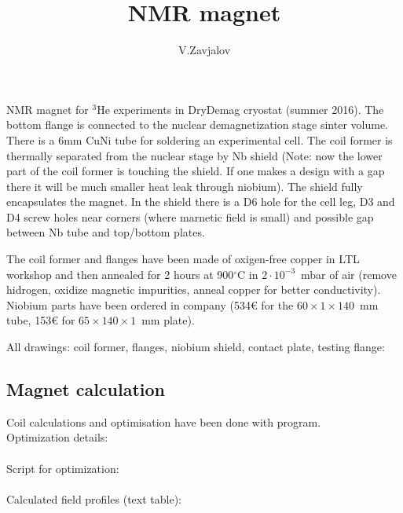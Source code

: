 \documentclass[a4paper]{article}
\title{NMR magnet}
\author{V.Zavjalov}
\begin{document}
\maketitle

NMR magnet for $^3$He experiments in DryDemag cryostat (summer 2016). The bottom flange
is connected to the nuclear demagnetization stage sinter volume. There is
a 6mm CuNi tube for soldering an experimental cell. The coil former is
thermally separated from the nuclear stage by Nb shield (Note: now the
lower part of the coil former is touching the shield. If one makes a
design with a gap there it will be much smaller heat leak through
niobium). The shield fully encapsulates the magnet. In the shield there
is a D6 hole for the cell leg, D3 and D4 screw holes near corners (where
marnetic field is small) and possible gap between Nb tube and top/bottom
plates.


The coil former and flanges have been made of oxigen-free copper in LTL
workshop and then annealed for 2 hours at 900$^\circ$C in
$2\cdot10^{-3}$~mbar of air (remove hidrogen, oxidize magnetic
impurities, anneal copper for better conductivity). Niobium parts have
been ordered in \Firmetal{} company (534\euro{} for the
$60\times1\times140$~mm tube, 153\euro{} for $65\times140\times1$~mm
plate).

All drawings: coil former, flanges, niobium shield, contact plate, testing flange:\\



\subsection*{Magnet calculation}
Coil calculations and optimisation have been done with \MagnettiProg{} program.\\
Optimization details:\\
\\
Script for optimization:\\
\\
Calculated field profiles (text table):\\
\end{document}
